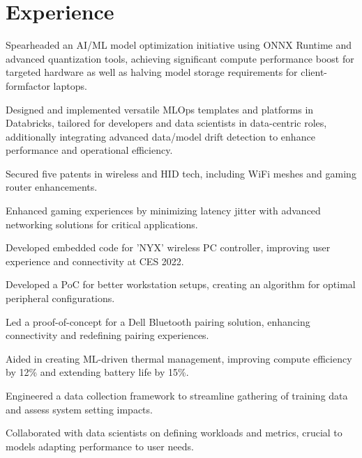 \documentclass[]{resume-openfont}
\begin{document}
\begin{minipage}[t]{1\textwidth}
\section{Experience}
\titlerule
\vspace{2.5 mm}

\vspace{\topsep}
\begin{tightemize}
    \item Spearheaded an AI/ML model optimization initiative using ONNX Runtime and advanced quantization tools, achieving significant compute performance boost for targeted hardware as well as halving model storage requirements for client-formfactor laptops.
    \item Designed and implemented versatile MLOps templates and platforms in Databricks, tailored for developers and data scientists in data-centric roles, additionally integrating advanced data/model drift detection to enhance performance and operational efficiency.
    \item Secured five patents in wireless and HID tech, including WiFi meshes and gaming router enhancements.
    \item Enhanced gaming experiences by minimizing latency jitter with advanced networking solutions for critical applications.
    \item Developed embedded code for 'NYX' wireless PC controller, improving user experience and connectivity at CES 2022.
    \item Developed a PoC for better workstation setups, creating an algorithm for optimal peripheral configurations.    
\end{tightemize}
\sectionsep

\begin{tightemize}
    \item Led a proof-of-concept for a Dell Bluetooth pairing solution, enhancing connectivity and redefining pairing experiences.
    \item Aided in creating ML-driven thermal management, improving compute efficiency by 12\% and extending battery life by 15\%.
    \item Engineered a data collection framework to streamline gathering of training data and assess system setting impacts.
    \item Collaborated with data scientists on defining workloads and metrics, crucial to models adapting performance to user needs.
\end{tightemize}
\sectionsep


\end{minipage}
\end{document}
